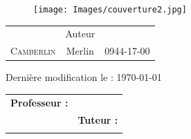 \begin{titlepage}
\begin{sffamily}
\begin{center}
        \begin{figure}[h!]
        \centering
        \texttt{[image: Images/couverture2.jpg]}
        \end{figure}
    
\vfill
\large   
    
        \begin{table}[ht!]
\centering
\large
            \begin{tabular}{lcr}
                     & \Large{Auteur} & \\
                \LARGE{\textsc{Camberlin}} & \Large{Merlin} & \Large{0944-17-00} \\

            \end{tabular}
  
        \end{table}
\vspace{3cm}
    \begin{center}
        Dernière modification le : \today
    \end{center}
    
    
\vfill

\begin{tabular}{p{}p{}}
    \flushleft \textbf{Professeur :} \\
    \flushleft %
    & \flushright \textbf{Tuteur : }\\
    \flushright %
\end{tabular} 
    
\end{center}
\end{sffamily}
\end{titlepage}
